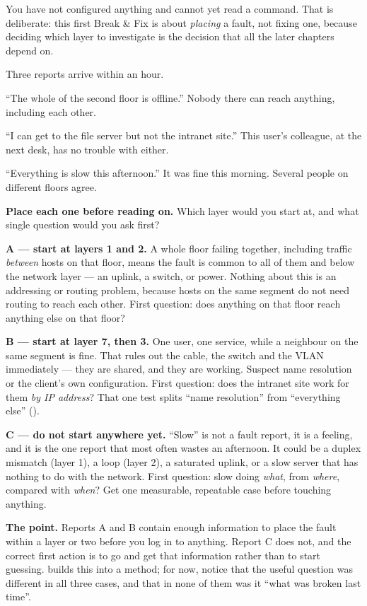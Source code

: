 \begin{breakfix}
You have not configured anything and cannot yet read a  command. That is
deliberate: this first Break \& Fix is about \emph{placing} a fault, not fixing
one, because deciding which layer to investigate is the decision that all the
later chapters depend on.

Three reports arrive within an hour.

\begin{tight}
  \item[\textbf{A.}] ``The whole of the second floor is offline.'' Nobody there can
        reach anything, including each other.
  \item[\textbf{B.}] ``I can get to the file server but not the intranet site.''
        This user's colleague, at the next desk, has no trouble with either.
  \item[\textbf{C.}] ``Everything is slow this afternoon.'' It was fine this
        morning. Several people on different floors agree.
\end{tight}

\textbf{Place each one before reading on.} Which layer would you start at, and
what single question would you ask first?

\medskip
\textbf{A --- start at layers 1 and 2.} A whole floor failing together, including
traffic \emph{between} hosts on that floor, means the fault is common to all of
them and below the network layer --- an uplink, a switch, or power. Nothing about
this is an addressing or routing problem, because hosts on the same segment do not
need routing to reach each other. First question: does anything on that floor
reach anything else on that floor?

\textbf{B --- start at layer 7, then 3.} One user, one service, while a neighbour
on the same segment is fine. That rules out the cable, the switch and the VLAN
immediately --- they are shared, and they are working. Suspect name resolution or
the client's own configuration. First question: does the intranet site work for
them \emph{by IP address}? That one test splits ``name resolution'' from
``everything else'' ().

\textbf{C --- do not start anywhere yet.} ``Slow'' is not a fault report, it is a
feeling, and it is the one report that most often wastes an afternoon. It could be
a duplex mismatch (layer 1), a loop (layer 2), a saturated uplink, or a slow server
that has nothing to do with the network. First question: slow doing \emph{what},
from \emph{where}, compared with \emph{when}? Get one measurable, repeatable case
before touching anything.

\medskip
\textbf{The point.} Reports A and B contain enough information to place the fault
within a layer or two before you log in to anything. Report C does not, and the
correct first action is to go and get that information rather than to start
guessing.  builds this into a method; for now, notice that the
useful question was different in all three cases, and that in none of them was it
``what was broken last time''.
\end{breakfix}

